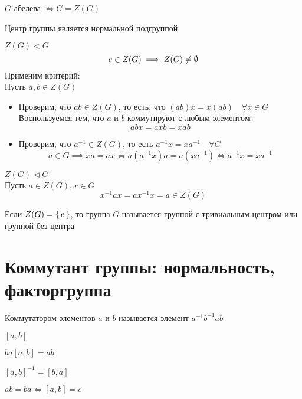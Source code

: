 \begin{property}
	$ G $ абелева $ \iff G = Z(G) $
\end{property}

\begin{theorem}
	Центр группы является нормальной подгруппой
\end{theorem}

\begin{iproof}
	\item $ Z(G) < G $
	$$ e \in Z(G) \implies Z(G) \ne \emptyset $$
	Применим критерий: \\
	Пусть $ a, b \in Z(G) $
	\begin{itemize}
		\item Проверим, что $ ab \in Z(G) $, то есть, что $ (ab)x = x(ab) \quad \forall x \in G $ \\
		Воспользуемся тем, что $ a $ и $ b $ коммутируют с любым элементом:
		$$ abx = axb = xab $$
		\item Проверим, что $ a^{-1} \in Z(G) $, то есть $ a^{-1}x = xa^{-1} \quad \forall G $
		$$ a \in G \implies xa = ax \iff a(a^{-1}x)a = a(xa^{-1}) \iff a^{-1}x = xa^{-1} $$
	\end{itemize}
	\item $ Z(G) \vartriangleleft G $ \\
	Пусть $ a \in Z(G), x \in G $
	$$ x^{-1}ax = ax^{-1}x = a \in Z(G) $$
\end{iproof}

\begin{definition}
	Если $ Z(G) = \set{e} $, то группа $ G $ называется группой с тривиальным центром или группой без центра
\end{definition}

\section{Коммутант группы: нормальность, факторгруппа}

\begin{definition}
	Коммутатором элементов $ a $ и $ b $ называется элемент $ a^{-1}b^{-1}ab $
\end{definition}

\begin{notation}
	$ [a, b] $
\end{notation}

\begin{props}
	\item $ ba[a, b] = ab $
	\item $ [a, b]^{-1} = [b, a] $
	\item $ ab = ba \iff [a, b] = e $
\end{props}

